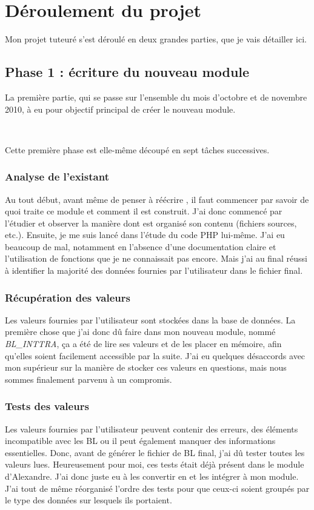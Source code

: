\section{Déroulement du projet}
Mon projet tuteuré s'est déroulé en deux grandes parties, que je vais détailler ici.

\subsection{Phase 1 : écriture du nouveau module}
La première partie, qui se passe sur l'ensemble du mois d'octobre et de novembre 2010, à eu pour objectif principal de créer le nouveau module.

~

Cette première phase est elle-même découpé en sept tâches successives.

\subsubsection{Analyse de l'existant}
Au tout début, avant même de penser à réécrire \pireus, il faut commencer par savoir de quoi traite ce module et comment il est construit. J'ai donc commencé par l'étudier et observer la manière dont est organisé son contenu (fichiers sources, etc.). Ensuite, je me suis lancé dans l'étude du code PHP lui-même. J'ai eu beaucoup de mal, notamment en l'absence d'une documentation claire et l'utilisation de fonctions que je ne connaissait pas encore. Mais j'ai au final réussi à identifier la majorité des données fournies par l'utilisateur dans le fichier final.

\subsubsection{Récupération des valeurs}
Les valeurs fournies par l'utilisateur sont stockées dans la base de données. La première chose que j'ai donc dû faire dans mon nouveau module, nommé \emph{BL\_INTTRA}, ça a été de lire ses valeurs et de les placer en mémoire, afin qu'elles soient facilement accessible par la suite. J'ai eu quelques désaccords avec mon supérieur sur la manière de stocker ces valeurs en questions, mais nous sommes finalement parvenu à un compromis.

\subsubsection{Tests des valeurs}
Les valeurs fournies par l'utilisateur peuvent contenir des erreurs, des éléments incompatible avec les BL ou il peut également manquer des informations essentielles. Donc, avant de générer le fichier de BL final, j'ai dû tester toutes les valeurs lues. Heureusement pour moi, ces tests était déjà présent dans le module d'Alexandre. J'ai donc juste eu à les convertir en \vb{} et les intégrer à mon module. J'ai tout de même réorganisé l'ordre des tests pour que ceux-ci soient groupés par le type des données sur lesquels ils portaient.

